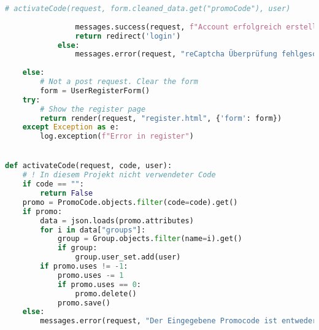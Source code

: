 \begin{lstlisting}[language=Python]
                    # activateCode(request, form.cleaned_data.get("promoCode"), user)
                
                messages.success(request, f"Account erfolgreich erstellt!")
                return redirect('login')
            else:
                messages.error(request, "reCaptcha Überprüfung fehlgeschlagen. Versuche es bitte erneut.")
            
    else:
        # Not a post request. Clear the form
        form = UserRegisterForm()
    try:
        # Show the register page
        return render(request, "register.html", {'form': form})
    except Exception as e:
        log.exception(f"Error in register")


def activateCode(request, code, user):
    # ! In diesem Projekt nicht verwendeter Code
    if code == "":
        return False
    promo = PromoCode.objects.filter(code=code).get()
    if promo:
        data = json.loads(promo.attributes)
        for i in data["groups"]:
            group = Group.objects.filter(name=i).get()
            if group:
                group.user_set.add(user)
        if promo.uses != -1:
            promo.uses -= 1
            if promo.uses == 0:
                promo.delete()
            promo.save()
    else:
        messages.error(request, "Der Eingegebene Promocode ist entweder falsch geschrieben oder nicht existent")
        

\end{lstlisting}